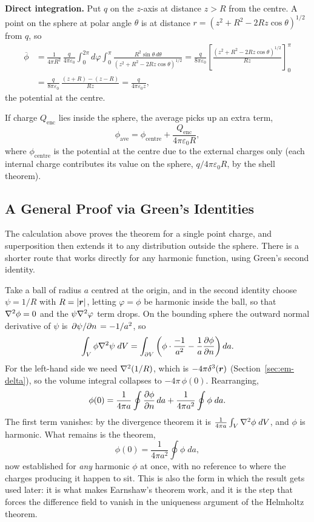 \textbf{Direct integration.} Put $q$ on the $z$-axis at distance $z>R$ from the centre. A point on the sphere at polar angle $\theta$ is at distance $r = (z^2+R^2-2Rz\cos\theta)^{1/2}$ from $q$, so
\begin{align*}
    \overline{\phi} &= \frac{1}{4\pi R^2}\,\frac{q}{4\pi\varepsilon_0}\int_0^{2\pi}\!\!d\varphi\int_0^{\pi}\frac{R^2\sin\theta\,d\theta}{(z^2+R^2-2Rz\cos\theta)^{1/2}}
    = \frac{q}{8\pi\varepsilon_0}\left[\frac{(z^2+R^2-2Rz\cos\theta)^{1/2}}{Rz}\right]_0^{\pi} \\
    &= \frac{q}{8\pi\varepsilon_0}\,\frac{(z+R)-(z-R)}{Rz}
    = \frac{q}{4\pi\varepsilon_0 z},
\end{align*}
the potential at the centre.

If charge $Q_\text{enc}$ lies inside the sphere, the average picks up an extra term,
\[
    \phi_\text{ave} = \phi_\text{centre} + \frac{Q_\text{enc}}{4\pi\varepsilon_0R},
\]
where $\phi_\text{centre}$ is the potential at the centre due to the external charges only (each internal charge contributes its value on the sphere, $q/4\pi\varepsilon_0R$, by the shell theorem).

\subsection{A General Proof via Green's Identities}

The calculation above proves the theorem for a single point charge, and superposition then extends it to any distribution outside the sphere. There is a shorter route that works directly for any harmonic function, using Green's second identity.

Take a ball of radius $a$ centred at the origin, and in the second identity choose $\psi = 1/R$ with $R = |\bm{r}|$, letting $\varphi = \phi$ be harmonic inside the ball, so that $\laplacian\phi = 0$ and the $\psi\laplacian\varphi$ term drops. On the bounding sphere the outward normal derivative of $\psi$ is $\pdv*{\psi}{n} = -1/a^2$, so
\[
    \int_V \phi\laplacian{\psi}\; dV = \int_{\partial V}\left(\phi\cdot\frac{-1}{a^2} - \frac{1}{a}\pdv{\phi}{n}\right) da .
\]
For the left-hand side we need $\laplacian(1/R)$, which is $-4\pi\delta^3(\bm{r})$ (Section~\ref{sec:em-delta}), so the volume integral collapses to $-4\pi\,\phi(0)$. Rearranging,
\[
    \phi(0) = \frac{1}{4\pi a}\oint \pdv{\phi}{n}\, da + \frac{1}{4\pi a^2}\oint \phi\; da .
\]
The first term vanishes: by the divergence theorem it is $\frac{1}{4\pi a}\int_V \laplacian{\phi}\; dV$, and $\phi$ is harmonic. What remains is the theorem,
\[
    \phi(0) = \frac{1}{4\pi a^2}\oint \phi\; da,
\]
now established for \emph{any} harmonic $\phi$ at once, with no reference to where the charges producing it happen to sit. This is also the form in which the result gets used later: it is what makes Earnshaw's theorem work, and it is the step that forces the difference field to vanish in the uniqueness argument of the Helmholtz theorem.

